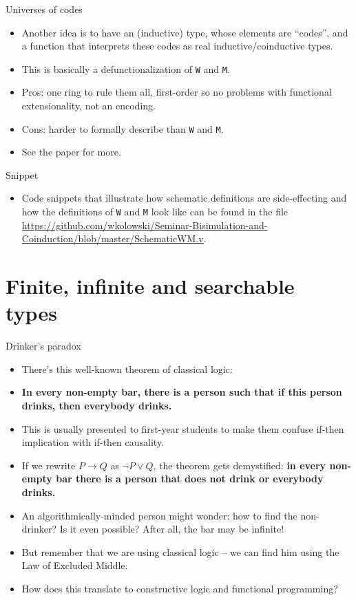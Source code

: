 \documentclass{beamer}
\begin{document}
\begin{frame}{Universes of codes}
\begin{itemize}
	\item Another idea is to have an (inductive) type, whose elements are ``codes'', and a function that interprets these codes as real inductive/coinductive types.
	\item This is basically a defunctionalization of \texttt{W} and \texttt{M}.
	\item Pros: one ring to rule them all, first-order so no problems with functional extensionality, not an encoding.
	\item Cons: harder to formally describe than \texttt{W} and \texttt{M}.
	\item See the paper \href{http://jmchapman.io/papers/levitation.pdf}{\color{blue}{The gentle art of levitation}} for more.
\end{itemize}
\end{frame}

\begin{frame}{Snippet}
\begin{itemize}
	\item Code snippets that illustrate how schematic definitions are side-effecting and how the definitions of \texttt{W} and \texttt{M} look like can be found in the file \url{https://github.com/wkolowski/Seminar-Bisimulation-and-Coinduction/blob/master/SchematicWM.v}.
\end{itemize}
\end{frame}

\section{Finite, infinite and searchable types}

\begin{frame}{Drinker's paradox}
\begin{itemize}
	\item There's this well-known theorem of classical logic:
	\item \textbf{In every non-empty bar, there is a person such that if this person drinks, then everybody drinks.}
	\item This is usually presented to first-year students to make them confuse if-then implication with if-then causality.
	\item If we rewrite $P \to Q$ as $\neg P \lor Q$, the theorem gets demystified: \textbf{in every non-empty bar there is a person that does not drink or everybody drinks.}
	\item An algorithmically-minded person might wonder: how to find the non-drinker? Is it even possible? After all, the bar may be infinite!
	\item But remember that we are using classical logic -- we can find him using the Law of Excluded Middle.
	\item How does this translate to constructive logic and functional programming?
\end{itemize}
\end{frame}
\end{document}
